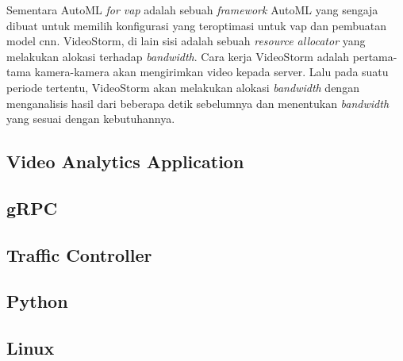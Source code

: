     Sementara AutoML \textit{for \gls{vap}} adalah sebuah \textit{framework} AutoML yang sengaja dibuat untuk memilih konfigurasi yang teroptimasi untuk \gls{vap} dan pembuatan model \gls{cnn}. VideoStorm, di lain sisi
    adalah sebuah \textit{resource allocator} yang melakukan alokasi terhadap \textit{bandwidth}. Cara kerja VideoStorm adalah pertama-tama kamera-kamera akan mengirimkan video kepada server.
    Lalu pada suatu periode tertentu, VideoStorm akan melakukan alokasi \textit{bandwidth} dengan menganalisis hasil dari beberapa detik sebelumnya dan menentukan \textit{bandwidth} yang sesuai dengan kebutuhannya.
    
    \subsection{Video Analytics Application}
    
    
    \subsection{gRPC}
    \subsection{Traffic Controller}
    \subsection{Python}
    \subsection{Linux}
    


